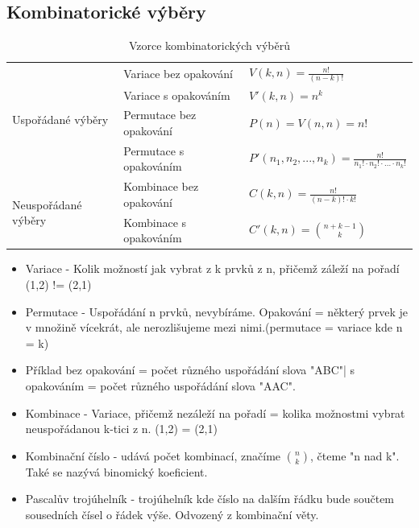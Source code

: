 \documentclass[10pt,a4paper]{article}
\begin{document}
\subsection{Kombinatorické výběry}
\renewcommand{\arraystretch}{2} 
\begin{table}[ht]
\centering
\begin{tabular}{l|l|l}
\hline
\multirow{4}{*}{Uspořádané výběry}   & Variace bez opakování   & $\displaystyle V(k, n) = \frac{n!}{(n-k)!}$ \\
                                     & Variace s opakováním    & $\displaystyle V'(k, n) = n^k$ \\
                                     & Permutace bez opakování & $\displaystyle P(n) = V(n, n) = n!$ \\
                                     & Permutace s opakováním  & $\displaystyle P'(n_1,n_2,...,n_k) = \frac{ n!}{n_1!\cdot{}n_2!\cdot{}...\cdot{}n_k!}$ \\
\multirow{2}{*}{Neuspořádané výběry} & Kombinace bez opakování & $\displaystyle C(k, n) = \frac{n!}{(n-k)!\cdot k!}$ \\
                                     & Kombinace s opakováním  & $\displaystyle C'(k, n) = \genfrac{(}{)}{0pt}{0}{n+k-1}{k}$ \\ 
\hline
\end{tabular}
\caption{Vzorce kombinatorických výběrů}
\label{tab:kombVzorce}
\end{table}
\renewcommand{\arraystretch}{1} 
\begin{itemize}
\item Variace - Kolik možností jak vybrat z k prvků z n, přičemž záleží na pořadí (1,2) != (2,1)
\item Permutace - Uspořádání n prvků, nevybíráme. Opakování = některý prvek je v množině vícekrát, ale nerozlišujeme mezi nimi.(permutace = variace kde n = k)
\item Příklad bez opakování = počet různého uspořádání slova "ABC"| s opakováním = počet různého uspořádání slova "AAC".
\item Kombinace - Variace, přičemž nezáleží na pořadí = kolika možnostmi vybrat neuspořádanou k-tici z n. (1,2) = (2,1)
\item Kombinační číslo - udává počet kombinací, značíme $\displaystyle \binom{n}{k}$, čteme "n nad k". Také se nazývá binomický koeficient.
\item Pascalův trojúhelník - trojúhelník kde číslo na dalším řádku bude součtem sousedních čísel o řádek výše. Odvozený z kombinační věty.
\end{itemize}
\end{document}
